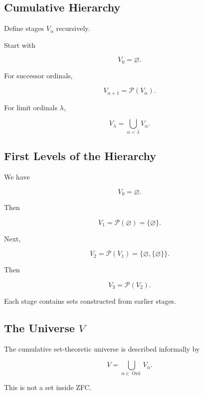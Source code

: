 \subsection{Cumulative Hierarchy}
\label{subsec:cumulative-hierarchy}

Define stages \(V_\alpha\) recursively.

Start with

\[
\boxed{
V_0
=
\varnothing.
}
\]

For successor ordinals,

\[
\boxed{
V_{\alpha+1}
=
\mathcal{P}(V_\alpha).
}
\]

For limit ordinals \(\lambda\),

\[
\boxed{
V_\lambda
=
\bigcup_{\alpha<\lambda}
V_\alpha.
}
\]

\subsection{First Levels of the Hierarchy}
\label{subsec:first-levels-cumulative-hierarchy}

We have

\[
V_0
=
\varnothing.
\]

Then

\[
V_1
=
\mathcal{P}(\varnothing)
=
\{\varnothing\}.
\]

Next,

\[
V_2
=
\mathcal{P}(V_1)
=
\{
\varnothing,
\{\varnothing\}
\}.
\]

Then

\[
V_3
=
\mathcal{P}(V_2).
\]

Each stage contains sets constructed from earlier stages.

\subsection{The Universe \(V\)}
\label{subsec:set-theoretic-universe-v}

The cumulative set-theoretic universe is described informally by

\[
\boxed{
V
=
\bigcup_{\alpha\in\operatorname{Ord}}
V_\alpha.
}
\]

This is not a set inside ZFC.

